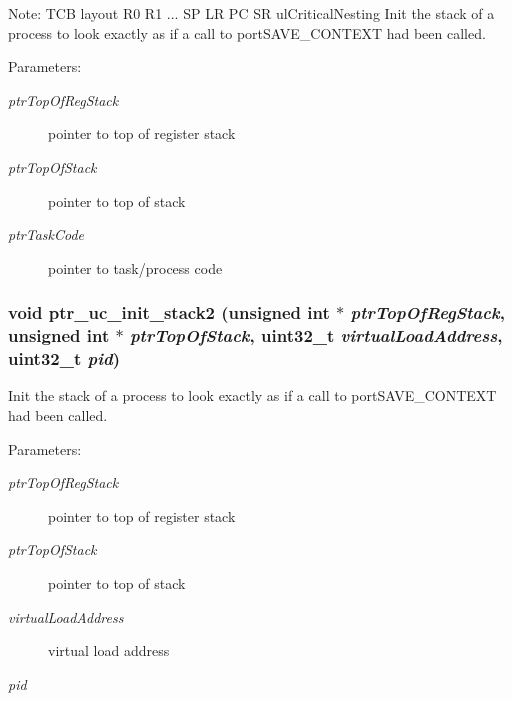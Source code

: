 \begin{Desc}
\item[Note:]TCB layout R0 R1 ... SP LR PC SR ulCriticalNesting Init the stack of a process to look exactly as if a call to portSAVE\_\-CONTEXT had been called. \end{Desc}
\begin{Desc}
\item[Parameters:]
\begin{description}
\item[{\em ptrTopOfRegStack}]pointer to top of register stack \item[{\em ptrTopOfStack}]pointer to top of stack \item[{\em ptrTaskCode}]pointer to task/process code \end{description}
\end{Desc}
\hypertarget{group___p_o_r_t_i_n_g_s_a_p7000_g3f08a8875f9050ca642a553fb7a59bb2}{
\subsubsection[{ptr\_\-uc\_\-init\_\-stack2}]{\setlength{\rightskip}{0pt plus 5cm}void ptr\_\-uc\_\-init\_\-stack2 (unsigned int $\ast$ {\em ptrTopOfRegStack}, \/  unsigned int $\ast$ {\em ptrTopOfStack}, \/  uint32\_\-t {\em virtualLoadAddress}, \/  uint32\_\-t {\em pid})}}
\label{group___p_o_r_t_i_n_g_s_a_p7000_g3f08a8875f9050ca642a553fb7a59bb2}


Init the stack of a process to look exactly as if a call to portSAVE\_\-CONTEXT had been called. \begin{Desc}
\item[Parameters:]
\begin{description}
\item[{\em ptrTopOfRegStack}]pointer to top of register stack \item[{\em ptrTopOfStack}]pointer to top of stack \item[{\em virtualLoadAddress}]virtual load address \item[{\em pid}]\end{description}
\end{Desc}
